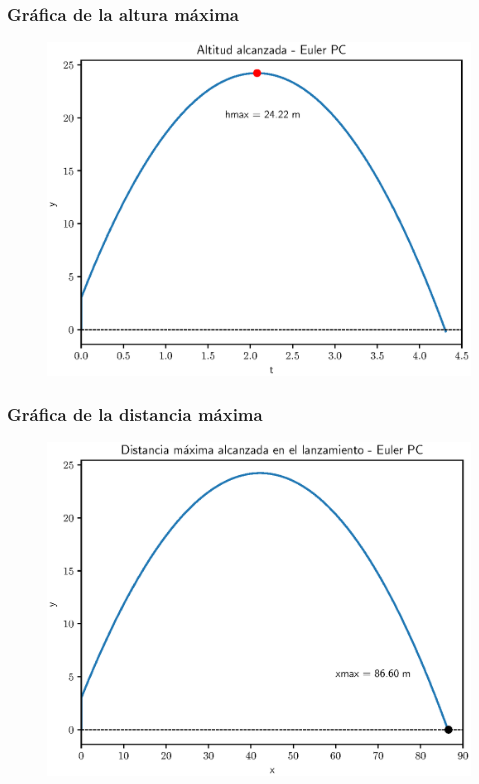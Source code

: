 \documentclass[12pt]{beamer}
\begin{document}
\begin{frame}
\frametitle{Gráfica de la altura máxima}
\begin{figure}
    \centering
    \includegraphics[scale=0.55]{Imagenes/plot_eulerPC_ejercicio_02_02.eps}
\end{figure}
\end{frame}
\begin{frame}
\frametitle{Gráfica de la distancia máxima}
\begin{figure}
    \centering
    \includegraphics[scale=0.55]{Imagenes/plot_eulerPC_ejercicio_02_01.eps}
\end{figure}
\end{frame}
\end{document}
